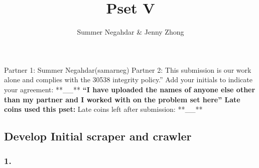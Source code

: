 \documentclass[
  letterpaper,
  DIV=11,
  numbers=noendperiod]{scrartcl}
\title{Pset V}
\author{Summer Negahdar \& Jenny Zhong}
\date{}
\begin{document}
\maketitle



Partner 1: Summer Negahdar(samarneg) Partner 2: This submission is our
work alone and complies with the 30538 integrity policy.'' Add your
initials to indicate your agreement: **\_\_** \textbf{\textbf{\textbf{
``I have uploaded the names of anyone else other than my partner and I
worked with on the problem set here'' Late coins used this pset: }}}
Late coins left after submission: **\_\_**

\subsection{Develop Initial scraper and
crawler}\label{develop-initial-scraper-and-crawler}

\subsubsection{1.}\label{section}
\end{document}
